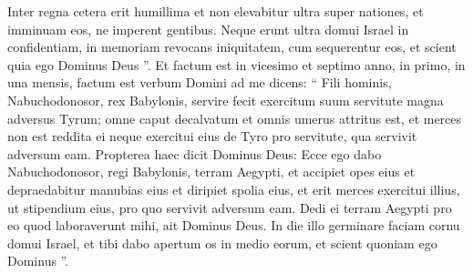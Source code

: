 \begin{biblechapter}
\begin{biblechapter}
\begin{biblechapter}
\begin{biblechapter}
\begin{biblechapter}
\begin{biblechapter}
\begin{biblechapter}
\begin{biblechapter}
\begin{biblechapter}
\begin{biblechapter}
\begin{biblechapter}
\begin{biblechapter}
\begin{biblechapter}
\begin{biblechapter}
\begin{biblechapter}
\begin{biblechapter}
\begin{biblechapter}
\begin{biblechapter}
\begin{biblechapter}
\begin{biblechapter}
\begin{biblechapter}
\begin{biblechapter}
\begin{biblechapter}
\begin{biblechapter}
\begin{biblechapter}
\begin{biblechapter}
\begin{biblechapter}
\begin{biblechapter}
\begin{biblechapter}
\verse Inter regna cetera erit humillima et non elevabitur ultra super nationes, et imminuam eos, ne imperent gentibus. 
\verse Neque erunt ultra domui Israel in confidentiam, in memoriam revocans iniquitatem, cum sequerentur eos, et scient quia ego Dominus Deus ”.
 \verse Et factum est in vicesimo et septimo anno, in primo, in una mensis, factum est verbum Domini ad me dicens: 
\verse “ Fili hominis, Nabuchodonosor, rex Babylonis, servire fecit exercitum suum servitute magna adversus Tyrum; omne caput decalvatum et omnis umerus attritus est, et merces non est reddita ei neque exercitui eius de Tyro pro servitute, qua servivit adversum eam.
 \verse Propterea haec dicit Dominus Deus: Ecce ego dabo Nabuchodonosor, regi Babylonis, terram Aegypti, et accipiet opes eius et depraedabitur manubias eius et diripiet spolia eius, et erit merces exercitui illius, 
\verse ut stipendium eius, pro quo servivit adversum eam. Dedi ei terram Aegypti pro eo quod laboraverunt mihi, ait Dominus Deus. 
\verse In die illo germinare faciam cornu domui Israel, et tibi dabo apertum os in medio eorum, et scient quoniam ego Dominus ”.
 

\end{biblechapter}
\end{biblechapter}
\end{biblechapter}
\end{biblechapter}
\end{biblechapter}
\end{biblechapter}
\end{biblechapter}
\end{biblechapter}
\end{biblechapter}
\end{biblechapter}
\end{biblechapter}
\end{biblechapter}
\end{biblechapter}
\end{biblechapter}
\end{biblechapter}
\end{biblechapter}
\end{biblechapter}
\end{biblechapter}
\end{biblechapter}
\end{biblechapter}
\end{biblechapter}
\end{biblechapter}
\end{biblechapter}
\end{biblechapter}
\end{biblechapter}
\end{biblechapter}
\end{biblechapter}
\end{biblechapter}
\end{biblechapter}
